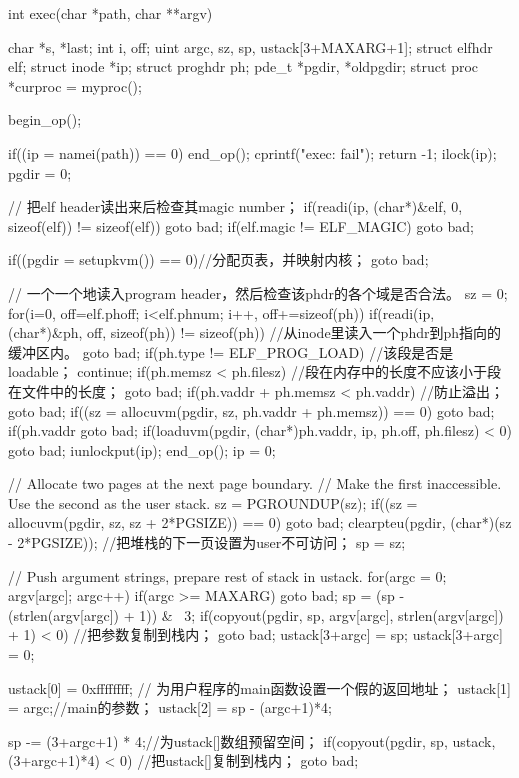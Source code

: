 \documentclass{swfcthesismscctex}
\begin{document}
\begin{ccode}
int exec(char *path, char **argv)
{
  char *s, *last;
  int i, off;
  uint argc, sz, sp, ustack[3+MAXARG+1];
  struct elfhdr elf;
  struct inode *ip;
  struct proghdr ph;
  pde_t *pgdir, *oldpgdir;
  struct proc *curproc = myproc();

  begin_op();

  if((ip = namei(path)) == 0){
    end_op();
    cprintf("exec: fail\n");
    return -1;
  }
  ilock(ip);
  pgdir = 0;

  // 把elf header读出来后检查其magic number；
  if(readi(ip, (char*)&elf, 0, sizeof(elf)) != sizeof(elf))
    goto bad;
  if(elf.magic != ELF_MAGIC)
    goto bad;

  if((pgdir = setupkvm()) == 0)//分配页表，并映射内核；
    goto bad;

  // 一个一个地读入program header，然后检查该phdr的各个域是否合法。
  sz = 0;
  for(i=0, off=elf.phoff; i<elf.phnum; i++, off+=sizeof(ph)){
    if(readi(ip, (char*)&ph, off, sizeof(ph)) != sizeof(ph)) //从inode里读入一个phdr到ph指向的缓冲区内。
      goto bad;
    if(ph.type != ELF_PROG_LOAD) //该段是否是loadable；
      continue;
    if(ph.memsz < ph.filesz) //段在内存中的长度不应该小于段在文件中的长度；
      goto bad;
    if(ph.vaddr + ph.memsz < ph.vaddr) //防止溢出；
      goto bad;
    if((sz = allocuvm(pgdir, sz, ph.vaddr + ph.memsz)) == 0) 
      goto bad;
    if(ph.vaddr %
      goto bad;
    if(loaduvm(pgdir, (char*)ph.vaddr, ip, ph.off, ph.filesz) < 0) 
      goto bad;
  }
  iunlockput(ip);
  end_op();
  ip = 0;

  // Allocate two pages at the next page boundary.
  // Make the first inaccessible.  Use the second as the user stack.
  sz = PGROUNDUP(sz);
  if((sz = allocuvm(pgdir, sz, sz + 2*PGSIZE)) == 0)
    goto bad;
  clearpteu(pgdir, (char*)(sz - 2*PGSIZE)); //把堆栈的下一页设置为user不可访问；
  sp = sz;

  // Push argument strings, prepare rest of stack in ustack.
  for(argc = 0; argv[argc]; argc++) {
    if(argc >= MAXARG)
      goto bad;
    sp = (sp - (strlen(argv[argc]) + 1)) & ~3; 
    if(copyout(pgdir, sp, argv[argc], strlen(argv[argc]) + 1) < 0) //把参数复制到栈内；
      goto bad;
    ustack[3+argc] = sp;
  }
  ustack[3+argc] = 0;

  ustack[0] = 0xffffffff;  // 为用户程序的main函数设置一个假的返回地址；
  ustack[1] = argc;//main的参数；
  ustack[2] = sp - (argc+1)*4;  

  sp -= (3+argc+1) * 4;//为ustack[]数组预留空间；
  if(copyout(pgdir, sp, ustack, (3+argc+1)*4) < 0) //把ustack[]复制到栈内；
    goto bad;

}
\end{ccode}
\end{document}
